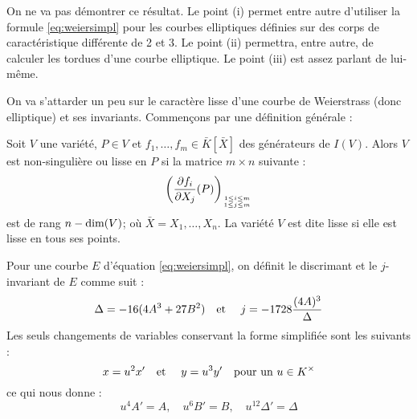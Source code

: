 \documentclass[a4paper]{article} %
\numberwithin{section}{part}
\numberwithin{equation}{section}
\newcommand\etmath{\textup{\quad et \quad}}
\begin{document}
On ne va pas démontrer ce résultat. Le point (i) permet entre autre d'utiliser
la formule \ref{eq:weiersimpl} pour les courbes elliptiques définies sur des
corps de caractéristique différente de 2 et 3. Le point (ii) permettra, entre
autre, de calculer les tordues d'une courbe elliptique. Le point (iii) est assez
parlant de lui-même.\par
On va s'attarder un peu sur le caractère lisse d'une courbe de Weierstrass (donc
elliptique) et ses invariants. Commençons par une définition générale :

\begin{defn}
Soit $V$ une variété, $P\in V$ et $f_1,\dots,f_m \in\bar{K}[\bar{X}]$ des 
générateurs de $I(V)$. Alors $V$ est non-singulière ou lisse en $P$ si la 
matrice $m \times n$ suivante :
\[\left(\frac{\partial f_i}{\partial X_j}(P)\right)_{1\leq i \leq m\atop 1\leq j
\leq m}\]
est de rang $n - \textup{dim}(V)$; où $\bar{X} = X_1,\dots,X_n$. La variété $V$
est dite lisse si elle est lisse en tous ses points.
\end{defn}

Pour une courbe $E$ d'équation \ref{eq:weiersimpl}, on définit le discrimant et
le $j$-invariant de $E$ comme suit :
\[\Delta = -16(4A^3 + 27B^2) \etmath j = -1728\frac{(4A)^3}{\Delta}\]
Les seuls changements de variables conservant la forme simplifiée sont les
suivants :
\[x = u^2x' \etmath y = u^3y' \textup{\quad pour un } u\in K^{\times}\]
ce qui nous donne :
\[u^4A' = A, \quad u^6B' = B, \quad u^{12}\Delta' = \Delta\]
\end{document}
